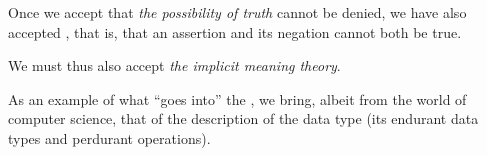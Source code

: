 \label{The Principle of Contradiction}

\begynd
\pind Once we accept  that \textsl{the possibility of
      truth} cannot be
      denied, we have also accepted , that is,
    that an assertion and its negation 
      cannot both be true.
\afslut

\label{The Implicit Meaning Theory}

\begynd
\pind We must thus also accept \textsl{the implicit meaning
      theory}. 
    
\pind {}

\noindent
\begynd
\pind As an example of 
\begynd
\pind what ``goes into'' the ,
\pind  we bring, albeit from 
      the world of computer science, 
\pind that of the description of the  data type \nyl
      (its endurant data types and perdurant operations).
\afslut
\afslut
\afslut
\pos{\psno}{\mnewfoil}



